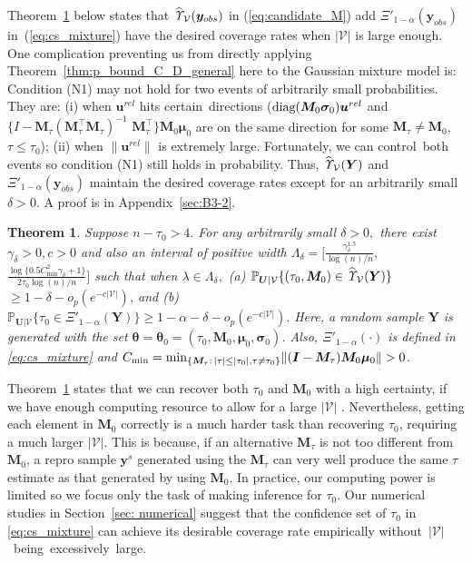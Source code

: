 \documentclass[12pt]{article}
\theoremstyle{shortspace}
\newtheorem{theorem}{Theorem}
\def\*#1{\bm{#1}}
\def\P{\mathbb P}
\newcommand{\diag}{\hbox{diag}}
\begin{document}
Theorem~\ref{thm:bound_of_C_d_mixture} below states that $\widehat{\it \Upsilon}_{{\mathcal V}}(\*y_{obs})$ in (\ref{eq:candidate_M}) add $\Xi'_{1-\alpha}(\*y_{obs})$ in~(\ref{eq:cs_mixture}) have the desired coverage rates when $|{\mathcal V}|$ is  large enough. 
One complication preventing us from directly applying Theorem~\ref{thm:p_bound_C_D_general} here to the Gaussian mixture model is: Condition (N1) may not hold for two events of 
 arbitrarily small probabilities.  They are: (i) when $\*u^{rel}$ hits certain~directions ($\diag(\*M_0\*\sigma_0) \*u^{rel}$ and $\{I-\*M_{\tau}(\*M_{\tau}^\top\*M_{\tau})^{-1}$ $\*M_{\tau}^\top\}\*M_0\*\mu_0$ are on the same direction for some $\*M_{\tau} \not = \*M_0$, $\tau \leq \tau_0$); (ii) when $\|\*u^{rel}\|$ is extremely large. Fortunately, we can control~both events so condition (N1) still holds in probability. 
 Thus,  $\widehat{\it \Upsilon}_{{\mathcal V}}(\*Y)$ and 
$\Xi'_{1-\alpha}(\*y_{obs})$ maintain the desired coverage rates except for an arbitrarily small $\delta>0$. 
A proof is in Appendix~\ref{sec:B3-2}. 
\begin{theorem}
\label{thm:bound_of_C_d_mixture}
Suppose $n-\tau_0>4.$ For any arbitrarily small $\delta >0,$ there exist $\gamma_\delta>0, c>0$ and also an interval of positive width $\Lambda_{\delta} =[\frac{\gamma_{\delta}^{1.5}}{\log(n)/n},$ $\frac{\log\{0.5C^2_{\min}\gamma_{\delta} + 1\}}{2 \tau_0 \log(n)/n}]$ such that when $\lambda \in \Lambda_{\delta},$ 
(a) $\P_{\*U | {\mathcal V}}\{(\tau_0, \*M_0) \in \widehat{\it \Upsilon}_{{\mathcal V}}(\*Y)\}$ $\geq 1- \delta - o_p(e^{-c|\mathcal V|})$, and  (b) $\P_{\*U | {\mathcal V}}\{\tau_0 \in \Xi'_{1-\alpha}(\*Y)\}  \geq 1-\alpha- \delta - o_p(e^{-c|\mathcal V|}).$ 
Here, a random sample $\*Y$ is generated with the set $\*\theta = \*\theta_0 = (\tau_0, {\*M_0}, \*\mu_0, \*\sigma_0)$. 
Also, $\Xi'_{1-\alpha}(\cdot)$ is defined in \eqref{eq:cs_mixture} and $C_{\min} = 
{\min}_{\small \{\*M_\tau: \, |\tau| \leq |\tau_0|, \tau \neq \tau_0\}} 
\|(\*I - \*M_\tau)\*M_0\*\mu_0\| > 0$.
 \end{theorem}


Theorem~\ref{thm:bound_of_C_d_mixture} states that we can recover both $\tau_0$ and $\*M_0$ with a high certainty, if we have enough computing resource to allow for a large $|\mathcal V|$ . Nevertheless, getting each element in $\*M_0$ correctly is a much harder task than recovering $\tau_0$, requiring a much larger $|\mathcal V|.$ This is because, if an alternative ${\*M}_\tau$ is not too different from $\*M_0$, a repro sample $\*y^s$ generated using the ${\*M}_\tau$ can very well produce the same $\tau$ estimate as that generated by using $\*M_0.$  
In practice,
 our computing power is limited so we focus only the task of making inference for $\tau_0$. Our numerical studies in Section~\ref{sec: numerical} suggest that the confidence set of $\tau_0$ in \eqref{eq:cs_mixture} can achieve its desirable coverage rate empirically without~$|\mathcal V|$~being~excessively~large. 
\end{document}
